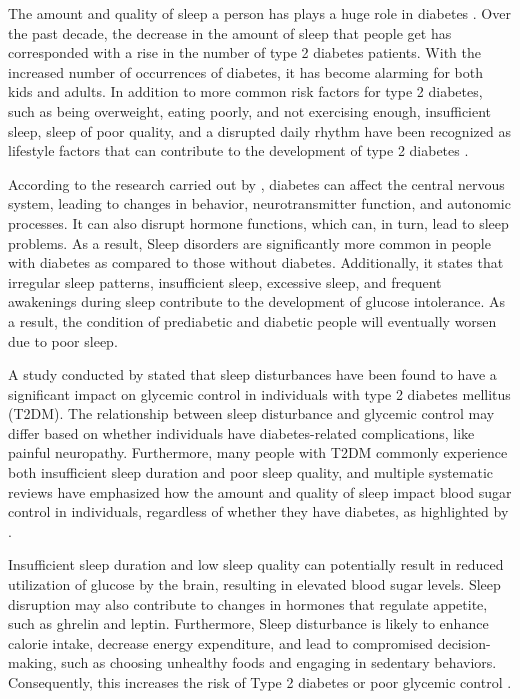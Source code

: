 
The amount and quality of sleep a person has plays a huge role in diabetes
\parencite{khandelwal-2017}. Over the past decade, the decrease in the amount of
sleep that people get has corresponded with a rise in the number of type 2
diabetes patients. With the increased number of occurrences of diabetes, it has
become alarming for both kids and adults. In addition to more common risk
factors for type 2 diabetes, such as being overweight, eating poorly, and not
exercising enough,  insufficient sleep, sleep of poor quality, and a disrupted
daily rhythm have been recognized as lifestyle factors that can contribute to
the development of type 2 diabetes \parencite{sondrup-2022}.

According to the research carried out by \textcite{van-cauter-2021}, diabetes
can affect the central nervous system, leading to changes in behavior,
neurotransmitter function, and autonomic processes. It can also disrupt hormone
functions, which can, in turn, lead to sleep problems. As a result, Sleep
disorders are significantly more common in people with diabetes as compared to
those without diabetes. Additionally, it states that irregular sleep patterns,
insufficient sleep, excessive sleep, and frequent awakenings during sleep
contribute to the development of glucose intolerance. As a result, the condition
of prediabetic and diabetic people will eventually worsen due to poor sleep.

A study conducted by \textcite{zhu-2017} stated that sleep disturbances have been
found to have a significant impact on glycemic control in individuals with type
2 diabetes mellitus (T2DM). The relationship between sleep disturbance and
glycemic control may differ based on whether individuals have diabetes-related
complications, like painful neuropathy. Furthermore, many people with T2DM
commonly experience both insufficient sleep duration and poor sleep quality, and
multiple systematic reviews have emphasized how the amount and quality of sleep
impact blood sugar control in individuals, regardless of whether they have
diabetes, as highlighted by \textcite{smyth-2020}.


Insufficient sleep duration and low sleep quality can potentially result in
reduced utilization of glucose by the brain, resulting in elevated blood sugar
levels. Sleep disruption may also contribute to changes in hormones that
regulate appetite, such as ghrelin and leptin. Furthermore, Sleep disturbance is
likely to enhance calorie intake, decrease energy expenditure, and lead to
compromised decision-making, such as choosing unhealthy foods and engaging in
sedentary behaviors. Consequently, this increases the risk of Type 2 diabetes or
poor glycemic control \parencite{zhu-2017}.

